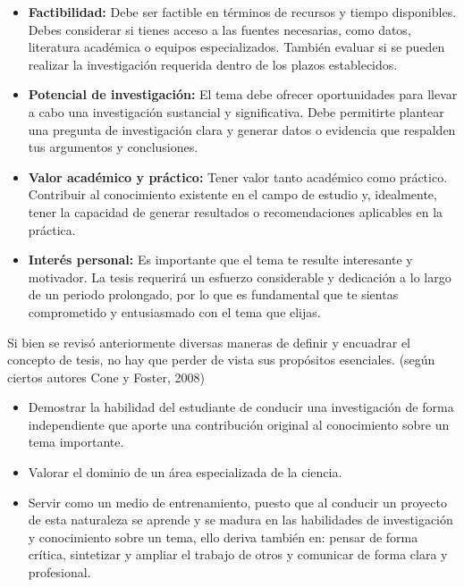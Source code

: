 \documentclass[
	11pt, %
]{beamer}
\begin{document}
\begin{frame}
  \begin{itemize}
  \item \textbf{Factibilidad:} Debe ser factible en términos de recursos y tiempo disponibles. Debes considerar si tienes acceso a las fuentes necesarias, como datos, literatura académica o equipos especializados. También evaluar si se pueden realizar la investigación requerida dentro de los plazos establecidos.
  \item \textbf{Potencial de investigación:} El tema debe ofrecer oportunidades para llevar a cabo una investigación sustancial y significativa. Debe permitirte plantear una pregunta de investigación clara y generar datos o evidencia que respalden tus argumentos y conclusiones.
  \end{itemize}
\end{frame}

\begin{frame}
  \begin{itemize}
  \item \textbf{Valor académico y práctico:} Tener valor tanto académico como práctico. Contribuir al conocimiento existente en el campo de estudio y, idealmente, tener la capacidad de generar resultados o recomendaciones aplicables en la práctica.
  \item \textbf{Interés personal:} Es importante que el tema te resulte interesante y motivador. La tesis requerirá un esfuerzo considerable y dedicación a lo largo de un periodo prolongado, por lo que es fundamental que te sientas comprometido y entusiasmado con el tema que elijas.
  \end{itemize}
\end{frame}

\begin{frame}

  Si bien se revisó anteriormente diversas maneras de definir y encuadrar el concepto de tesis, no hay que perder de vista sus propósitos esenciales. (según ciertos autores Cone y Foster, 2008)\\

  \begin{itemize}
  \item Demostrar la habilidad del estudiante de conducir una investigación de forma independiente que aporte una contribución original al conocimiento sobre un tema importante.
  \item Valorar el dominio de un área especializada de la ciencia.
  \item Servir como un medio de entrenamiento, puesto que al conducir un proyecto de esta naturaleza se aprende y se madura en las habilidades de investigación y conocimiento sobre un tema, ello deriva también en: pensar de forma crítica, sintetizar y ampliar el trabajo de otros y comunicar de forma clara y profesional.
  \end{itemize}
  
\end{frame}

\end{document}
